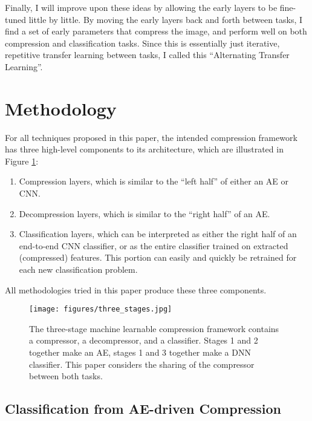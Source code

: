 \documentclass[twoside,11pt]{article}
\begin{document}
Finally, I will improve upon these ideas by allowing the early layers to be fine-tuned
little by little.
By moving the early layers back and forth between tasks, I find a set of early parameters
that compress the image, and perform well on both compression and classification tasks.
Since this is essentially just iterative, repetitive transfer learning between tasks,
I called this ``Alternating Transfer Learning''.





\section{Methodology} \label{fixed}

For all techniques proposed in this paper, the intended compression framework has
three high-level components to its architecture, which are
 illustrated in Figure \ref{fig:three_stages}:
\begin{enumerate}
    \item Compression layers, which is similar to the ``left half'' of either an AE or CNN. 
    \item Decompression layers, which is similar to the ``right half'' of an AE. 
    \item Classification layers, which can be interpreted as either the right half of
     an end-to-end CNN classifier, or as the entire classifier trained on extracted (compressed) features. This portion can easily and quickly be retrained for each new classification problem.
\end{enumerate}

All methodologies tried in this paper produce these three components.

\begin{figure}[h]
  \texttt{[image: figures/three\_stages.jpg]}
  \caption{The three-stage machine learnable compression framework contains a compressor, a decompressor, and a classifier. Stages 1 and 2 together make an AE, stages 1 and 3 together make a DNN classifier. This paper considers the sharing of the compressor between both tasks. }
  \label{fig:three_stages}
\end{figure}

\subsection{Classification from AE-driven Compression} \label{general}
\end{document}
